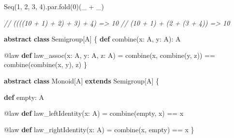 \documentclass[
  ignorenonframetext,
]{beamer}
\newenvironment{Shaded}{}{}
\newcommand{\CommentTok}[1]{\textcolor[rgb]{0.38,0.63,0.69}{\textit{#1}}}
\newcommand{\DecValTok}[1]{\textcolor[rgb]{0.25,0.63,0.44}{#1}}
\newcommand{\FunctionTok}[1]{\textcolor[rgb]{0.02,0.16,0.49}{#1}}
\newcommand{\KeywordTok}[1]{\textcolor[rgb]{0.00,0.44,0.13}{\textbf{#1}}}
\newcommand{\NormalTok}[1]{#1}
\begin{document}
\begin{frame}[fragile]

\begin{Shaded}
\begin{Highlighting}[]
\NormalTok{Seq(}\DecValTok{1}\NormalTok{, }\DecValTok{2}\NormalTok{, }\DecValTok{3}\NormalTok{, }\DecValTok{4}\NormalTok{).}\FunctionTok{par}\NormalTok{.}\FunctionTok{fold}\NormalTok{(}\DecValTok{0}\NormalTok{)(_ + _)}

\CommentTok{// ((((10 + 1) + 2) + 3) + 4) => 10}
\CommentTok{// (10 + 1) + (2 + (3 + 4))   => 10}
\end{Highlighting}
\end{Shaded}

\end{frame}

\begin{frame}[fragile]

\begin{Shaded}
\begin{Highlighting}[]
\KeywordTok{abstract} \KeywordTok{class}\NormalTok{ Semigroup[A] \{}
  \KeywordTok{def} \FunctionTok{combine}\NormalTok{(x: A, y: A): A}

\NormalTok{  @law }\KeywordTok{def} \FunctionTok{law_assoc}\NormalTok{(x: A, y: A, z: A) =}
    \FunctionTok{combine}\NormalTok{(x, }\FunctionTok{combine}\NormalTok{(y, z)) == }\FunctionTok{combine}\NormalTok{(}\FunctionTok{combine}\NormalTok{(x, y), z)}
\NormalTok{\}}
\end{Highlighting}
\end{Shaded}

\end{frame}

\begin{frame}[fragile]

\begin{Shaded}
\begin{Highlighting}[]
\KeywordTok{abstract} \KeywordTok{class}\NormalTok{ Monoid[A]}
  \KeywordTok{extends}\NormalTok{ Semigroup[A] \{}

  \KeywordTok{def}\NormalTok{ empty: A}

\NormalTok{  @law }\KeywordTok{def} \FunctionTok{law_leftIdentity}\NormalTok{(x: A) =}
    \FunctionTok{combine}\NormalTok{(empty, x) == x}

\NormalTok{  @law }\KeywordTok{def} \FunctionTok{law_rightIdentity}\NormalTok{(x: A) =}
    \FunctionTok{combine}\NormalTok{(x, empty) == x}
\NormalTok{\}}
\end{Highlighting}
\end{Shaded}

\end{frame}
\end{document}
